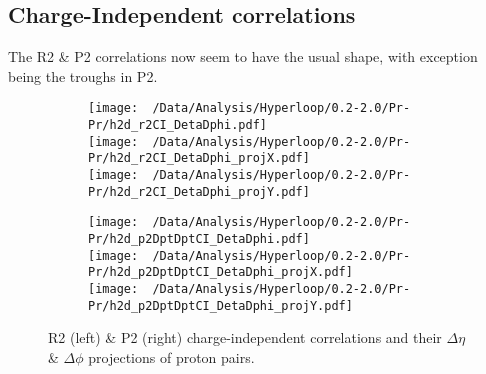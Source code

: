\documentclass[12pt,a4paper,twoside]{report}
\begin{document}
\subsection{Charge-Independent correlations}
The R2 \& P2 correlations now seem to have the usual shape, with exception being the troughs in P2.
\begin{figure}[H]
	\begin{subfigure}{0.49\linewidth}
		\texttt{[image: ~/Data/Analysis/Hyperloop/0.2-2.0/Pr-Pr/h2d\_r2CI\_DetaDphi.pdf]}\\
		\texttt{[image: ~/Data/Analysis/Hyperloop/0.2-2.0/Pr-Pr/h2d\_r2CI\_DetaDphi\_projX.pdf]}\\
		\texttt{[image: ~/Data/Analysis/Hyperloop/0.2-2.0/Pr-Pr/h2d\_r2CI\_DetaDphi\_projY.pdf]}\\
	\end{subfigure}
	\begin{subfigure}{0.49\linewidth}
		\texttt{[image: ~/Data/Analysis/Hyperloop/0.2-2.0/Pr-Pr/h2d\_p2DptDptCI\_DetaDphi.pdf]}\\
		\texttt{[image: ~/Data/Analysis/Hyperloop/0.2-2.0/Pr-Pr/h2d\_p2DptDptCI\_DetaDphi\_projX.pdf]}\\
		\texttt{[image: ~/Data/Analysis/Hyperloop/0.2-2.0/Pr-Pr/h2d\_p2DptDptCI\_DetaDphi\_projY.pdf]}\\
	\end{subfigure}
	\caption{R2 (left) \& P2 (right) charge-independent correlations and their $\Delta\eta$ \& $\Delta\phi$ projections of proton pairs.}
\end{figure}
\end{document}
